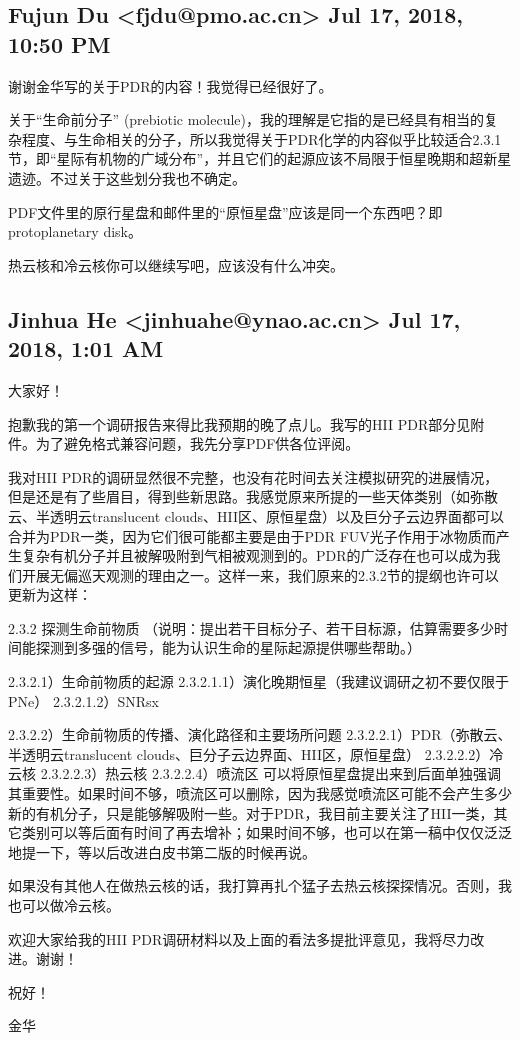 \documentclass{article}
\newcommand\from[2]{\subsection{{#1} {#2}}}
\newcommand\said[1]{#1}
\begin{document}
\from{
Fujun Du <fjdu@pmo.ac.cn>
}{
Jul 17, 2018, 10:50 PM
}
\said{
谢谢金华写的关于PDR的内容！我觉得已经很好了。

关于“生命前分子” (prebiotic molecule)，我的理解是它指的是已经具有相当的复杂程度、与生命相关的分子，所以我觉得关于PDR化学的内容似乎比较适合2.3.1节，即“星际有机物的广域分布”，并且它们的起源应该不局限于恒星晚期和超新星遗迹。不过关于这些划分我也不确定。

PDF文件里的原行星盘和邮件里的“原恒星盘”应该是同一个东西吧？即protoplanetary disk。

热云核和冷云核你可以继续写吧，应该没有什么冲突。
}

\from{
Jinhua He <jinhuahe@ynao.ac.cn>
}
{
Jul 17, 2018, 1:01 AM
}
\said{
大家好！

抱歉我的第一个调研报告来得比我预期的晚了点儿。我写的HII PDR部分见附件。为了避免格式兼容问题，我先分享PDF供各位评阅。

我对HII PDR的调研显然很不完整，也没有花时间去关注模拟研究的进展情况，但是还是有了些眉目，得到些新思路。我感觉原来所提的一些天体类别（如弥散云、半透明云translucent clouds、HII区、原恒星盘）以及巨分子云边界面都可以合并为PDR一类，因为它们很可能都主要是由于PDR FUV光子作用于冰物质而产生复杂有机分子并且被解吸附到气相被观测到的。PDR的广泛存在也可以成为我们开展无偏巡天观测的理由之一。这样一来，我们原来的2.3.2节的提纲也许可以更新为这样：

2.3.2 探测生命前物质
（说明：提出若干目标分子、若干目标源，估算需要多少时间能探测到多强的信号，能为认识生命的星际起源提供哪些帮助。）

2.3.2.1）生命前物质的起源
2.3.2.1.1）演化晚期恒星（我建议调研之初不要仅限于PNe）
2.3.2.1.2）SNRsx

2.3.2.2）生命前物质的传播、演化路径和主要场所问题
2.3.2.2.1）PDR（弥散云、半透明云translucent clouds、巨分子云边界面、HII区，原恒星盘）
2.3.2.2.2）冷云核
2.3.2.2.3）热云核
2.3.2.2.4）喷流区
可以将原恒星盘提出来到后面单独强调其重要性。如果时间不够，喷流区可以删除，因为我感觉喷流区可能不会产生多少新的有机分子，只是能够解吸附一些。对于PDR，我目前主要关注了HII一类，其它类别可以等后面有时间了再去增补；如果时间不够，也可以在第一稿中仅仅泛泛地提一下，等以后改进白皮书第二版的时候再说。

如果没有其他人在做热云核的话，我打算再扎个猛子去热云核探探情况。否则，我也可以做冷云核。

欢迎大家给我的HII PDR调研材料以及上面的看法多提批评意见，我将尽力改进。谢谢！

祝好！

金华
}
\end{document}
